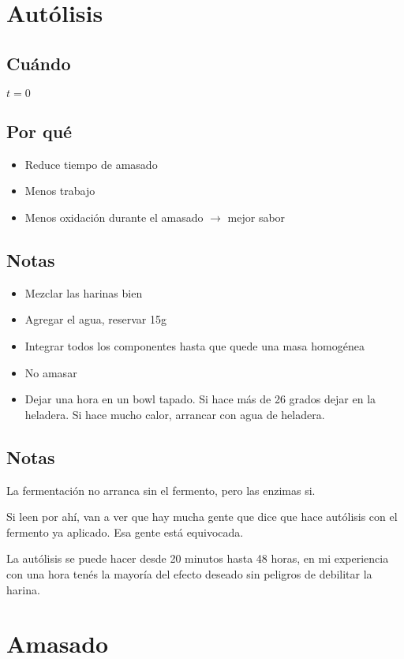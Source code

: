 \documentclass[10pt,a4paper]{article}
\begin{document}
\section{Autólisis}
\subsection*{Cuándo}
  $t=0$
\subsection*{Por qué}
  \begin{itemize}
    \item Reduce tiempo de amasado
    \item Menos trabajo
    \item Menos oxidación durante el amasado $\rightarrow$ mejor sabor
  \end{itemize}
\subsection*{Notas}
  \begin{itemize}
    \item Mezclar las harinas bien
    \item Agregar el agua, reservar 15g
    \item Integrar todos los componentes hasta que quede una masa homogénea
    \item No amasar
    \item Dejar una hora en un bowl tapado. Si hace más de 26 grados dejar en la
      heladera. Si hace mucho calor, arrancar con agua de heladera.
  \end{itemize}

\subsection*{Notas}
La fermentación no arranca sin el fermento, pero las enzimas si.

Si leen por ahí, van a ver que hay mucha gente que dice que hace autólisis con
el fermento ya aplicado. Esa gente está equivocada.

  La autólisis se puede hacer desde 20 minutos hasta 48 horas, en mi
  experiencia con una hora tenés la mayoría del efecto deseado sin
  peligros de debilitar la harina.

\section{Amasado}
\end{document}
